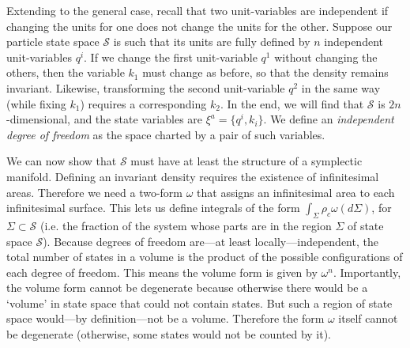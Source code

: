 \documentclass[letterpaper]{article}
\begin{document}

Extending to the general case, recall that two unit-variables are independent if changing the units for one does not change the units for the other. Suppose our particle state space $\mathcal{S}$ is such that its units are fully defined by $n$ independent unit-variables $q^i$. If we change the first unit-variable $q^1$ without changing the others, then the variable $k_1$ must change as before, so that the density remains invariant. Likewise, transforming the second unit-variable $q^2$ in the same way (while fixing $k_1$) requires a corresponding $k_2$. In the end, we will find that $\mathcal{S}$ is $2n$-dimensional, and the state variables are $\xi^a = \{ q^i, k_i \}$. We define an \textit{independent degree of freedom} as the space charted by a pair of such variables.

We can now show that $\mathcal{S}$ must have at least the structure of a symplectic manifold. Defining an invariant density requires the existence of infinitesimal areas. Therefore we need a two-form $\omega$ that assigns an infinitesimal area to each infinitesimal surface. This lets us define integrals of the form $\int_{\Sigma} \rho_c \omega(d\Sigma)$, for $\Sigma \subset \mathcal{S}$ (i.e. the fraction of the system whose parts are in the region $\Sigma$ of state space $\mathcal{S}$). Because degrees of freedom are---at least locally---independent, the total number of states in a volume is the product of the possible configurations of each degree of freedom. This means the volume form is given by $\omega^n$. Importantly, the volume form cannot be degenerate because otherwise there would be a `volume' in state space that could not contain states. But such a region of state space would---by definition---not be a volume. Therefore the form $\omega$ itself cannot be degenerate (otherwise, some states would not be counted by it). 
\end{document}
